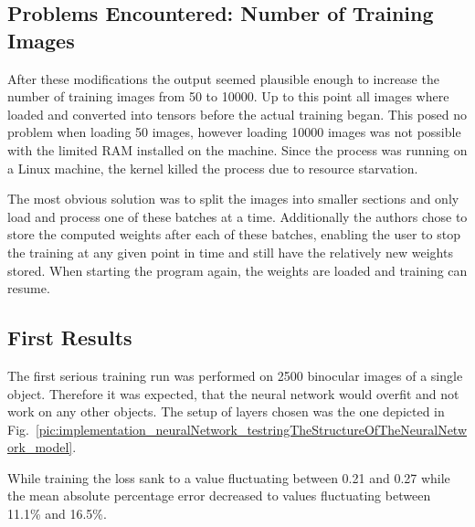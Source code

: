 \subsection{Problems Encountered: Number of Training Images}
After these modifications the output seemed plausible enough to increase the number of training images from 50 to 10000. Up to this point all images where loaded and converted into tensors before the actual training began. This posed no problem when loading 50 images, however loading 10000 images was not possible with the limited RAM installed on the machine. Since the process was running on a Linux machine, the kernel killed the process due to resource starvation.

The most obvious solution was to split the images into smaller sections and only load and process one of these batches at a time. Additionally the authors chose to store the computed weights after each of these batches, enabling the user to stop the training at any given point in time and still have the relatively new weights stored. When starting the program again, the weights are loaded and training can resume.

\subsection{First Results}
The first serious training run was performed on 2500 binocular images of a single object. Therefore it was expected, that the neural network would overfit and not work on any other objects. The setup of layers chosen was the one depicted in Fig.~\ref{pic:implementation_neuralNetwork_testringTheStructureOfTheNeuralNetwork_model}.

While training the loss sank to a value fluctuating between 0.21 and 0.27 while the mean absolute percentage error decreased to values fluctuating between 11.1\% and 16.5\%.

